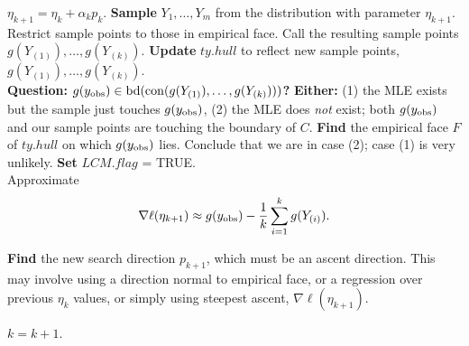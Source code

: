 {\begin{algorithmic}[1]
\State $\eta_{k+1} = \eta_k + \alpha_k p_k$.
\State \textbf{Sample} $Y_1, \ldots, Y_m$ from the distribution with parameter $\eta_{k+1}$.
	\State Restrict sample points to those in empirical face.
\EndIf
\State Call the resulting sample points $g(Y_{(1)}), \ldots, g(Y_{(k)})$.
\State \textbf{Update} $ty.hull$ to reflect new sample points, $g(Y_{(1)}), \ldots, g(Y_{(k)})$.\\
\State \textbf{Question: $g(y_{\text{obs}}) \in \operatorname{bd}( \operatorname{con}(g(Y_{(1)}), \ldots, g(Y_{(k)}) ))$? }
{} %
	\State \textbf{Either:}
	\State (1) the MLE exists but the sample just touches $g(y_{\text{obs}})$, 
	\State (2) the MLE does \emph{not} exist; both $g(y_{\text{obs}})$ and our sample points  
	\State are touching the boundary of $C$.
	\State \textbf{Find} the empirical face $F$ of $ty.hull$ on which $g(y_{\text{obs}})$ lies.
		\State Conclude that we are in case (2); case (1) is very unlikely.
		\State \textbf{Set} $LCM.flag$ = TRUE.
	\EndIf
\EndIf\\
	\State Approximate
	\begin{align} \label{E:nabla ell approx LCM}
	\nabla \ell( \eta_{k+1}) \approx g(y_{\text{obs}}) - \frac{1}{k}\sum_{i=1}^k g(Y_{(i)}).
	\end{align}


\State \textbf{Find} the new search direction $p_{k+1}$, which must be an ascent 
direction.
\Statex This may involve using a direction normal to empirical face, or a regression 
\Statex over previous $\eta_k$ values, or simply using steepest ascent, $\nabla \ell
( \eta_{k+1})$.

\State $k = k + 1$.
\EndWhile
\end{algorithmic}
}


